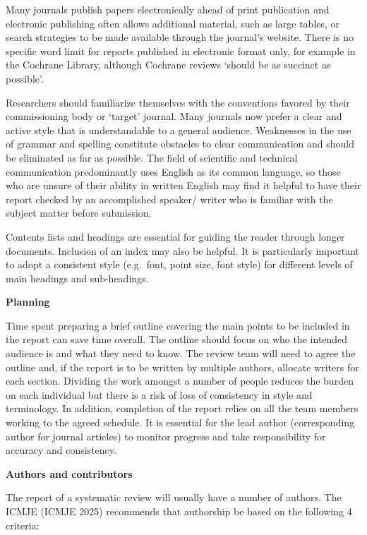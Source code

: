 \documentclass[
  11pt,
  a4paper,
  DIV=11,
  numbers=noendperiod]{scrreprt}
\begin{document}
Many journals publish papers electronically ahead of print publication
and electronic publishing often allows additional material, such as
large tables, or search strategies to be made available through the
journal's website. There is no specific word limit for reports published
in electronic format only, for example in the Cochrane Library, although
Cochrane reviews `should be as succinct as possible'.

Researchers should familiarize themselves with the conventions favored
by their commissioning body or `target' journal. Many journals now
prefer a clear and active style that is understandable to a general
audience. Weaknesses in the use of grammar and spelling constitute
obstacles to clear communication and should be eliminated as far as
possible. The field of scientific and technical communication
predominantly uses English as its common language, so those who are
unsure of their ability in written English may find it helpful to have
their report checked by an accomplished speaker/ writer who is familiar
with the subject matter before submission.

Contents lists and headings are essential for guiding the reader through
longer documents. Inclusion of an index may also be helpful. It is
particularly important to adopt a consistent style (e.g.~font, point
size, font style) for different levels of main headings and
sub-headings.

\textbf{Planning}

Time spent preparing a brief outline covering the main points to be
included in the report can save time overall. The outline should focus
on who the intended audience is and what they need to know. The review
team will need to agree the outline and, if the report is to be written
by multiple authors, allocate writers for each section. Dividing the
work amongst a number of people reduces the burden on each individual
but there is a risk of loss of consistency in style and terminology. In
addition, completion of the report relies on all the team members
working to the agreed schedule. It is essential for the lead author
(corresponding author for journal articles) to monitor progress and take
responsibility for accuracy and consistency.

\textbf{Authors and contributors}

The report of a systematic review will usually have a number of authors.
The ICMJE (ICMJE 2025) recommends that authorship be based on the
following 4 criteria:
\end{document}
